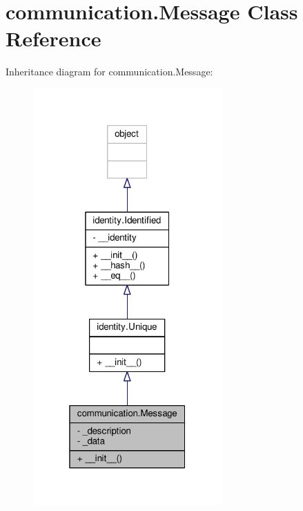 \hypertarget{classcommunication_1_1Message}{}\section{communication.\+Message Class Reference}
\label{classcommunication_1_1Message}


Inheritance diagram for communication.\+Message\+:\nopagebreak
\begin{figure}[H]
\begin{center}
\leavevmode
\includegraphics[width=205pt]{classcommunication_1_1Message__inherit__graph}
\end{center}
\end{figure}


